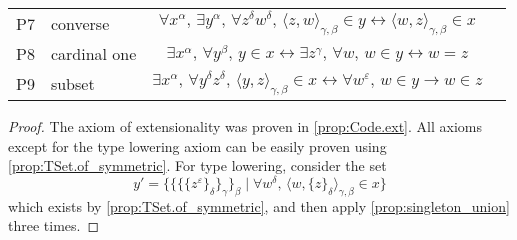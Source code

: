 \begin{theorem}
\begin{center}
\begin{tabular}{llcl}
      P7 & converse & \( \forall x^\alpha,\, \exists y^\alpha,\, \forall z^\delta w^\delta,\, \langle z, w \rangle_{\gamma,\beta} \in y \leftrightarrow \langle w, z \rangle_{\gamma,\beta} \in x \) \\
      P8 & cardinal one & \( \exists x^\alpha,\, \forall y^\beta,\, y \in x \leftrightarrow \exists z^\gamma,\, \forall w,\, w \in y \leftrightarrow w = z \) \\
      P9 & subset & \( \exists x^\alpha,\, \forall y^\delta z^\delta,\, \langle y, z \rangle_{\gamma,\beta} \in x \leftrightarrow \forall w^\varepsilon,\, w \in y \to w \in z \)
    \end{tabular}
  \end{center}
\end{theorem}
\begin{proof}
  The axiom of extensionality was proven in \cref{prop:Code.ext}.
  All axioms except for the type lowering axiom can be easily proven using \cref{prop:TSet.of_symmetric}.
  For type lowering, consider the set
  \[ y' = \{ \{\{\{z^\varepsilon\}_\delta\}_\gamma\}_\beta \mid \forall w^\delta,\, \langle w, \{ z \}_\delta \rangle_{\gamma,\beta} \in x \} \]
  which exists by \cref{prop:TSet.of_symmetric}, and then apply \cref{prop:singleton_union} three times.
\end{proof}

